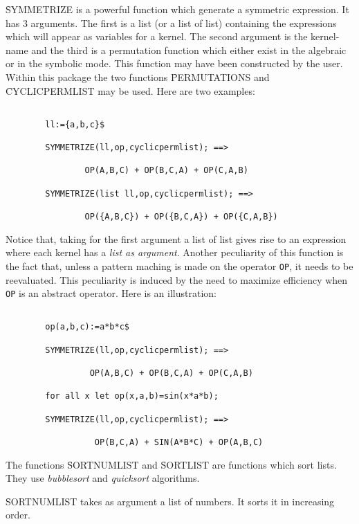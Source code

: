 \f{SYMMETRIZE} is a powerful function which generate a symmetric expression.
It has 3 arguments. The first is a list (or a list of list) containing
the expressions which will appear as variables for a kernel. The second
argument is the kernel-name and the third is a permutation function
which either exist in the algebraic or in the symbolic mode. This
function may have been constructed by the user. Within this package
the two functions \f{PERMUTATIONS} and \f{CYCLICPERMLIST} may be used.
Here are two examples:
\begin{verbatim}

        ll:={a,b,c}$

        SYMMETRIZE(ll,op,cyclicpermlist); ==>

                OP(A,B,C) + OP(B,C,A) + OP(C,A,B)

        SYMMETRIZE(list ll,op,cyclicpermlist); ==>

                OP({A,B,C}) + OP({B,C,A}) + OP({C,A,B})

\end{verbatim}
Notice that, taking for the first argument a list of list gives rise to
an expression where  each kernel has a {\em list as argument}. Another
peculiarity of this function is the fact that, unless a pattern maching is
made on the operator \verb+OP+, it needs to be reevaluated. This peculiarity
is induced by the need to maximize efficiency when \verb+OP+ is an abstract
operator. Here is an illustration:
\begin{verbatim}

        op(a,b,c):=a*b*c$

        SYMMETRIZE(ll,op,cyclicpermlist); ==>

                 OP(A,B,C) + OP(B,C,A) + OP(C,A,B)

        for all x let op(x,a,b)=sin(x*a*b);

        SYMMETRIZE(ll,op,cyclicpermlist); ==>

                  OP(B,C,A) + SIN(A*B*C) + OP(A,B,C)

\end{verbatim}
The functions \f{SORTNUMLIST} and \f{SORTLIST} are functions which sort
lists. They use {\em bubblesort} and {\em quicksort} algorithms.

\f{SORTNUMLIST} takes as argument a list of numbers. It sorts it in
increasing order.

